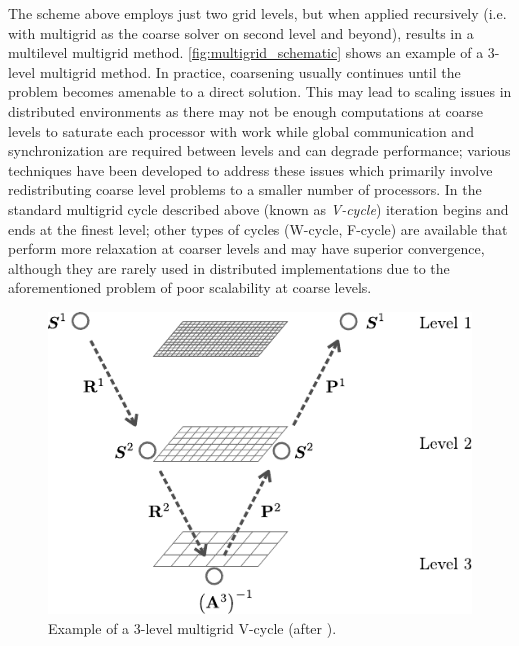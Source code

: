 The scheme above employs just two grid levels, but when applied recursively (i.e. with multigrid as the coarse solver on second level and beyond), results in a multilevel multigrid method.   \autoref{fig:multigrid_schematic} shows an example of a 3-level multigrid method.   In practice, coarsening usually continues until the problem becomes amenable to a direct solution.   This may lead to scaling issues in distributed environments as there may not be enough computations at coarse levels to saturate each processor with work while global communication and synchronization are required between levels and can degrade performance; various techniques have been developed to address these issues \cite{Chow2006} which primarily involve redistributing coarse level problems to a smaller number of processors.   In the standard multigrid cycle described above (known as \textit{V-cycle}) iteration begins and ends at the finest level; other types of cycles (W-cycle, F-cycle) are available that perform more relaxation at coarser levels and may have superior convergence, although they are rarely used in distributed implementations due to the aforementioned problem of poor scalability at coarse levels.

\begin{figure} [htbp]
  \centerline{\includegraphics[width=0.5\linewidth]{figs/multigrid_schematic}}
  \caption{\label{fig:multigrid_schematic} Example of a 3-level multigrid V-cycle (after \cite{Verdugo2016}).}
\end{figure}

